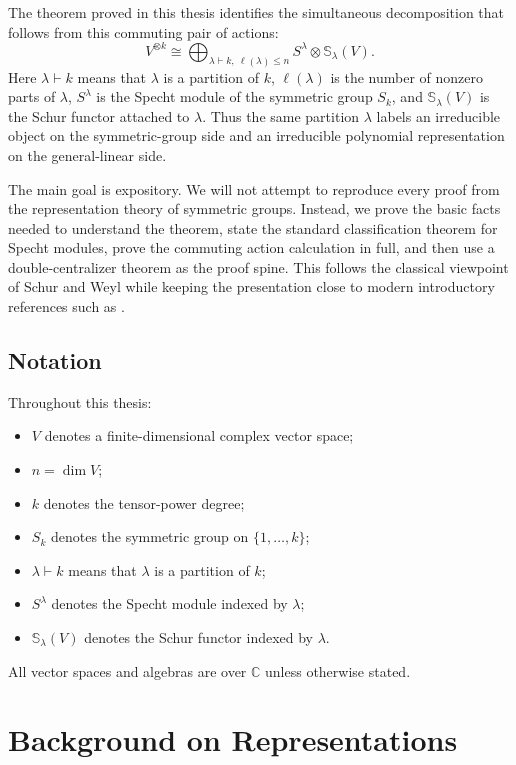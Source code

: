 \documentclass[12pt,a4paper]{article}
\theoremstyle{definition}
\theoremstyle{remark}
\newcommand{\C}{\mathbb{C}}
\newcommand{\Schur}[1]{\mathbb{S}_{#1}}
\begin{document}
The theorem proved in this thesis identifies the simultaneous decomposition
that follows from this commuting pair of actions:
\[
V^{\otimes k}
  \cong
  \bigoplus_{\lambda\vdash k,\ \ell(\lambda)\le n}
  S^\lambda\otimes \Schur{\lambda}(V).
\]
Here \(\lambda\vdash k\) means that \(\lambda\) is a partition of \(k\),
\(\ell(\lambda)\) is the number of nonzero parts of \(\lambda\),
\(S^\lambda\) is the Specht module of the symmetric group \(S_k\), and
\(\Schur{\lambda}(V)\) is the Schur functor attached to \(\lambda\).  Thus
the same partition \(\lambda\) labels an irreducible object on the
symmetric-group side and an irreducible polynomial representation on the
general-linear side.

The main goal is expository.  We will not attempt to reproduce every proof
from the representation theory of symmetric groups.  Instead, we prove the
basic facts needed to understand the theorem, state the standard
classification theorem for Specht modules, prove the commuting action
calculation in full, and then use a double-centralizer theorem as the proof
spine.  This follows the classical viewpoint of Schur and Weyl while keeping
the presentation close to modern introductory references such as
\cite{FultonHarris1991,Fulton1997,Etingof2011}.

\subsection*{Notation}

Throughout this thesis:
\begin{itemize}[leftmargin=2.2em]
  \item \(V\) denotes a finite-dimensional complex vector space;
  \item \(n=\dim V\);
  \item \(k\) denotes the tensor-power degree;
  \item \(S_k\) denotes the symmetric group on \(\{1,\dots,k\}\);
  \item \(\lambda\vdash k\) means that \(\lambda\) is a partition of \(k\);
  \item \(S^\lambda\) denotes the Specht module indexed by \(\lambda\);
  \item \(\Schur{\lambda}(V)\) denotes the Schur functor indexed by
  \(\lambda\).
\end{itemize}
All vector spaces and algebras are over \(\C\) unless otherwise stated.

\section{Background on Representations}
\end{document}
